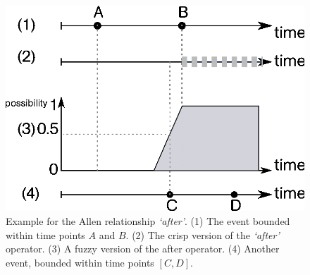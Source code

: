 \begin{example}
\begin{figure}
\centering
\includegraphics[scale=0.5]{graphs/fuzzyAllen.eps}
\caption{Example for the Allen relationship \emph{`after'}. (1) The event bounded within time points $A$ and $B$. (2) The crisp version of the \emph{`after'} operator. (3) A fuzzy version of the after operator. (4) Another event, bounded within time points $[C,D]$.}
\label{fig:fuzzy-allen-relationship}
\end{figure}
\end{example}




%
%
